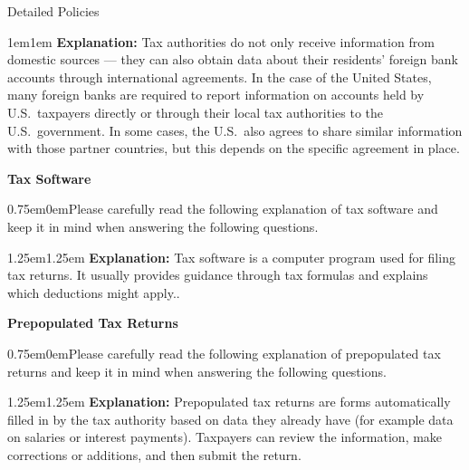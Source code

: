 \documentclass{beamer}
\begin{document}
\begin{frame}[allowframebreaks]{Detailed Policies}
\vspace{0.5em}
\begin{adjustwidth}{1em}{1em} \textbf{Explanation:} Tax authorities do not only receive information from domestic sources — they can also obtain data about their residents’ foreign bank accounts through international agreements. In the case of the United States, many foreign banks are required to report information on accounts held by U.S.\ taxpayers directly or through their local tax authorities to the U.S.\ government. In some cases, the U.S.\ also agrees to share similar information with those partner countries, but this depends on the specific agreement in place. \\ 
\end{adjustwidth}
\vspace{5em}
\textbf{Tax Software}\\
\begin{adjustwidth}{0.75em}{0em}Please carefully read the following explanation of tax software and keep it in mind when answering the following questions. \end{adjustwidth}
\begin{adjustwidth}{1.25em}{1.25em} \textbf{Explanation:} Tax software is a computer program used for filing tax returns. It usually provides guidance through tax formulas and explains which deductions might apply..
\end{adjustwidth}
\vspace{2em}
\textbf{Prepopulated Tax Returns}
\begin{adjustwidth}{0.75em}{0em}Please carefully read the following explanation of prepopulated tax returns and keep it in mind when answering the following questions. \end{adjustwidth}
\vspace{0.5em}
\begin{adjustwidth}{1.25em}{1.25em} \textbf{Explanation:} Prepopulated tax returns are forms automatically filled in by the tax authority  based on data they already have (for example data on salaries or interest payments). Taxpayers can review the information, make corrections or additions, and then submit the return.
\end{adjustwidth}
\hfill \hyperlink{Update2}{}
\end{frame}
\end{document}
